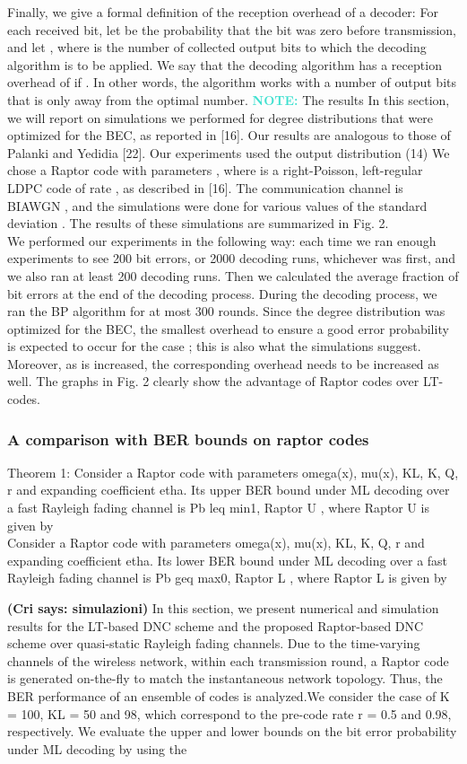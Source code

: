 \documentclass[12pt,a4paper,titlepage,twocolumn]{article}
\newcommand{\cri}[1]{\textcolor{MyColor2}{\textbf{(Cri says: #1)}}}
\newcommand{\note}{\textcolor{Turquoise}{\textbf{NOTE: }}}
\begin{document}
Finally, we give a formal definition of the reception overhead
of a decoder: For each received bit, let be the probability
that the bit was zero before transmission, and let
, where is the number of collected output
bits to which the decoding algorithm is to be applied. We say
that the decoding algorithm has a reception overhead of if
. In other words, the algorithm works with a
number of output bits that is only away from the optimal
number.
\note{The results}
In this section, we will report on simulations we performed
for degree distributions that were optimized for the BEC, as reported
in [16]. Our results are analogous to those of Palanki and
Yedidia [22].
Our experiments used the output distribution
(14)
We chose a Raptor code with parameters ,
where is a right-Poisson, left-regular LDPC code of rate
, as described in [16]. The communication channel is
BIAWGN , and the simulations were done for various values
of the standard deviation . The results of these simulations are
summarized in Fig. 2.\\
We performed our experiments in the following way: each
time we ran enough experiments to see 200 bit errors, or 2000
decoding runs, whichever was first, and we also ran at least 200
decoding runs. Then we calculated the average fraction of bit
errors at the end of the decoding process. During the decoding
process, we ran the BP algorithm for at most 300 rounds.
Since the degree distribution was optimized for the BEC, the
smallest overhead to ensure a good error probability is expected
to occur for the case ; this is also what the simulations
suggest. Moreover, as is increased, the corresponding overhead
needs to be increased as well.
The graphs in Fig. 2 clearly show the advantage of Raptor
codes over LT-codes.
\subsubsection{A comparison with BER bounds on raptor codes}
Theorem 1: Consider a Raptor code with parameters omega(x),
mu(x), KL, K, Q, r and expanding coefficient etha. Its upper
BER bound under ML decoding over a fast Rayleigh fading
channel is Pb leq min{1, Raptor
U
}, where Raptor
U is given by\\

Consider a Raptor code with parameters omega(x),
mu(x), KL, K, Q, r and expanding coefficient etha. Its lower
BER bound under ML decoding over a fast Rayleigh fading
channel is Pb geq max{0, Raptor
L
}, where Raptor
L is given by

\cri{simulazioni}
In this section, we present numerical and simulation results
for the LT-based DNC scheme and the proposed Raptor-based
DNC scheme over quasi-static Rayleigh fading channels. Due
to the time-varying channels of the wireless network, within
each transmission round, a Raptor code is generated on-the-fly
to match the instantaneous network topology. Thus, the BER
performance of an ensemble of codes is analyzed.We consider
the case of K = 100, KL = 50 and 98, which correspond to
the pre-code rate r = 0.5 and 0.98, respectively. We evaluate
the upper and lower bounds on the bit error probability under
ML decoding by using the
\end{document}
